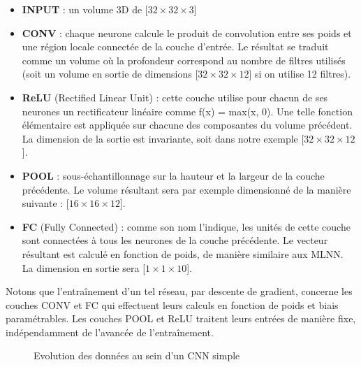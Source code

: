       \begin{itemize}
	\item \textbf{INPUT} : un volume 3D de [$32 \times 32 \times 3$]
	\item \textbf{CONV} : chaque neurone calcule le produit de convolution entre ses poids et une région locale connectée de la couche d’entrée. Le résultat se traduit comme un volume où la profondeur correspond au nombre de filtres utilisés (soit un volume en sortie de dimensions [$32 \times 32 \times 12$] si on utilise 12 filtres).

	\item \textbf{ReLU} (Rectified Linear Unit) : cette couche utilise pour chacun de ses neurones un rectificateur linéaire comme f(x) = max(x, 0). Une telle fonction élémentaire est appliquée sur chacune des composantes du volume précédent. La dimension de la sortie est invariante, soit dans notre exemple [$32 \times 32 \times 12$]. 
	\item \textbf{POOL} : sous-échantillonnage sur la hauteur et la largeur de la couche précédente. Le volume résultant sera par exemple dimensionné de la manière suivante : [$16 \times 16 \times 12$].
	\item \textbf{FC} (Fully Connected) : comme son nom l’indique, les unités de cette couche sont connectées à tous les neurones de la couche précédente. Le vecteur résultant est calculé en fonction de poids, de manière similaire aux \gls{MLNN}. La dimension en sortie sera [$1 \times 1 \times 10$].

      \end{itemize}
      Notons que l’entraînement d’un tel réseau, par descente de gradient, concerne les couches CONV et FC qui effectuent leurs calculs en fonction de poids et biais paramétrables. Les couches POOL et ReLU traitent leurs entrées de manière fixe, indépendamment de l’avancée de l’entraînement.

      \begin{figure}[H]
	  \centering
	  \caption{Evolution des données au sein d'un \gls{CNN} simple}
	  \label{fig:c1p3s1}
      \end{figure}

